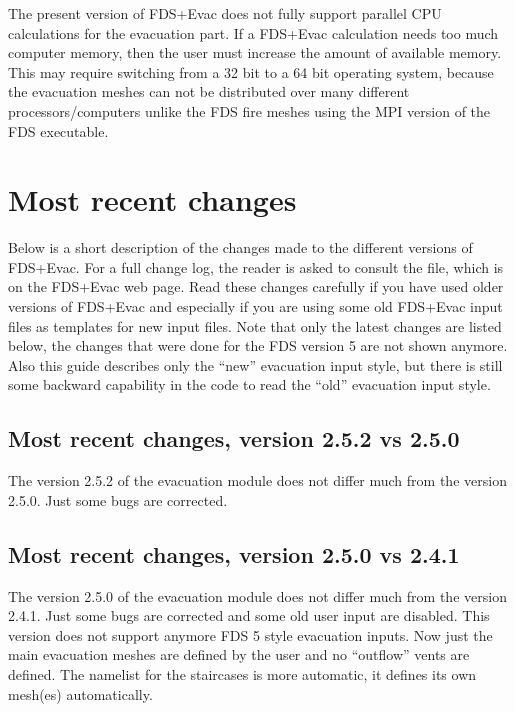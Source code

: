 \documentclass[12pt,a4paper,final,twoside]{stylevk}
\begin{document}
The present version of FDS+Evac does not fully support parallel CPU
calculations for the evacuation part.  If a FDS+Evac calculation needs
too much computer memory, then the user must increase the amount of
available memory.  This may require switching from a 32 bit to a 64
bit operating system, because the evacuation meshes can not be
distributed over many different processors/computers unlike the FDS
fire meshes using the MPI version of the FDS executable.



\section{Most recent changes}\label{Sec_RecentChanges}

\noindent Below is a short description of the changes made to the
different versions of FDS+Evac.  For a full change log, the reader is
asked to consult the  file, which is on the FDS+Evac
web page.  Read these changes carefully if you have used older
versions of FDS+Evac and especially if you are using some old FDS+Evac
input files as templates for new input files.  Note that only the
latest changes are listed below, the changes that were done for the
FDS version 5 are not shown anymore.  Also this guide describes only
the ``new'' evacuation input style, but there is still some backward
capability in the code to read the ``old'' evacuation input style.


\subsection{Most recent changes, version 2.5.2 vs
  2.5.0}\label{Sec_252vs250} 

\noindent The version 2.5.2 of the evacuation module does not differ
much from the version 2.5.0.  Just some bugs are corrected.

\subsection{Most recent changes, version 2.5.0 vs
  2.4.1}\label{Sec_250vs241} 

\noindent The version 2.5.0 of the evacuation module does not differ
much from the version 2.4.1.  Just some bugs are corrected and some
old user input are disabled.  This version does not support anymore
FDS 5 style evacuation inputs.  Now just the main evacuation meshes
are defined by the user and no ``outflow'' vents are defined.  The
 namelist for the staircases is more automatic, it defines
its own mesh(es) automatically.
\end{document}
